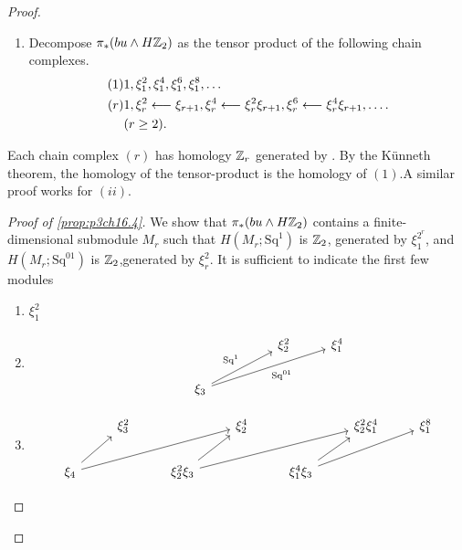 \documentclass[../main]{subfiles}
\begin{document}
\begin{proof}
\begin{enumerate}[label=(\roman*)]
    \item Decompose $\pi_{\ast}(bu \wedge H\mathbb{Z}_2)$ as the tensor product of the following chain complexes. \begin{align}
    
        (1) & 1,\xi_{1}^{2},\xi_{1}^{4},\xi_{1}^{6},\xi_{1}^{8},\dots\\
            
        (r) & 1,\xi_{r}^{2}\lal{} \xi_{r+1},\xi_{r}^{4}\lal{} \xi_{r}^{2}\xi_{r+1}, \xi_{r}^{6}\lal{} \xi_{r}^{4}\xi_{r+1},\dots.\\
          
         &(r \geq 2).
    \end{align}
 \end{enumerate}  
    Each chain complex $(r)$ has homology $\mathbb{Z}_{r}$ generated by . By the Künneth theorem, the homology of the tensor-product is the homology of $(1)$.A similar proof works for $(ii)$.
   \begin{proof}[Proof of \ref{prop:p3ch16.4}] We show that $\pi_{\ast}(bu \wedge H\mathbb{Z}_2)$ contains a finite-dimensional submodule $M_{r}$ such that $H(M_{r};\mathrm{Sq}^{1})$ is $\mathbb{Z}_2$, generated by $\xi_{1}^{2^{r}}$, and $H(M_{r};\mathrm{Sq}^{01})$ is $\mathbb{Z}_2$,generated by $\xi_{r}^{2}$. It is sufficient to indicate the first few modules \begin{enumerate}
       \item $\xi_{1}^{2}$
       \item 
\[\begin{tikzcd}
	{} &&& {\xi_{2}^{2}} & {\xi_{1}^{4}} \\
	& {\xi_{3}}
	\arrow["{\mathrm{Sq}^{1}}", from=2-2, to=1-4]
	\arrow["{\mathrm{Sq}^{01}}"', from=2-2, to=1-5]
\end{tikzcd}\]
\item \[\begin{tikzcd}
	& {\xi_{3}^{2}} && {\xi_{2}^{4}} && {\xi_{2}^{2}\xi_{1}^{4}} & {\xi_{1}^{8}} \\
	{\xi_{4}} && {\xi_{2}^{2}\xi_{3}} && {\xi_{1}^{4}\xi_{3}}
	\arrow[from=2-1, to=1-2]
	\arrow[from=2-1, to=1-4]
	\arrow[from=2-3, to=1-4]
	\arrow[from=2-3, to=1-6]
	\arrow[from=2-5, to=1-6]
	\arrow[from=2-5, to=1-7]
\end{tikzcd}\]
   \end{enumerate}
   

\end{proof}
\end{proof}
\end{document}
